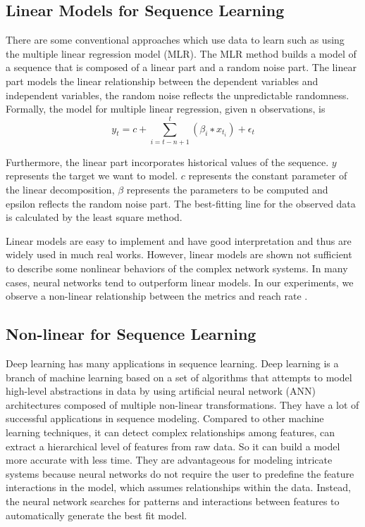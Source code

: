 \documentclass[5p]{elsarticle}
\newcommand{\dabiaolv}{reach rate }
\begin{document}
\subsection{Linear Models for Sequence Learning}

There are some conventional approaches which use data to learn such as using the multiple linear regression model (MLR). The MLR method builds a model of a sequence that is composed of a linear part and a random noise part. The linear part models the linear relationship between the dependent variables and independent variables, the random noise reflects the unpredictable randomness. Formally, the model for multiple linear regression, given n observations, is 
    $$y_t = c+\sum_{i=t-n+1}^{t}(\beta_i ∗ x_{t_i})+\epsilon_t$$

Furthermore, the linear part incorporates historical values of the sequence. $y$ represents the target we want to model. $c$ represents the constant parameter of the linear decomposition, $\beta$ represents the parameters to be computed and epsilon reflects the random noise part. The best-fitting line for the observed data is calculated by the least square method.

Linear models are easy to implement and have good interpretation and thus are widely used in much real works. However, linear models are shown not sufficient to describe some nonlinear behaviors of the complex network systems. In many cases, neural networks tend to outperform linear models. In our experiments, we observe a non-linear relationship between the metrics and \dabiaolv.

\subsection{Non-linear for Sequence Learning}

Deep learning has many applications in sequence learning. Deep learning is a branch of machine learning based on a set of algorithms that attempts to model high-level abstractions in data by using artificial neural network (ANN) architectures composed of multiple non-linear transformations. They have a lot of successful applications in sequence modeling. Compared to other machine learning techniques, it can detect complex relationships among features, can extract a hierarchical level of features from raw data. So it can build a model more accurate with less time. They are advantageous for modeling intricate systems because neural networks do not require the user to predefine the feature interactions in the model, which assumes relationships within the data. Instead, the neural network searches for patterns and interactions between features to automatically generate the best fit model.
\end{document}
